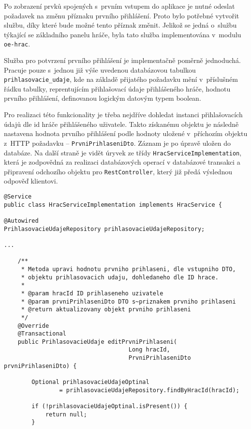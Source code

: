 \documentclass[12pt]{article}
\begin{document}
{Po zobrazení prvků spojených s~prvním vstupem do aplikace je nutné odeslat požadavek na změnu příznaku prvního přihlášení.
Proto bylo potřebné vytvořit službu, díky které bude možné tento příznak změnit.
Jelikož se jedná o~službu týkající se základního panelu hráče, byla tato služba implementována v~modulu \texttt{oe-hrac}.

Služba pro potvrzení prvního přihlášení je implementačně poměrně jednoduchá.
Pracuje pouze s~jednou již výše uvedenou databázovou tabulkou \texttt{prihlasovacie\_udaje},
kde na základě přijatého požadavku mění v~příslušném řádku tabulky,
reprentujícím přihlašovací údaje přihlášeného hráče, hodnotu prvního přihlášení,
definovanou logickým datovým typem boolean.

Pro realizaci této funkcionality je třeba nejdříve dohledat instanci přihlašovacích údajů dle id hráče přihlášeného uživatele.
Takto získanému objektu je následně nastavena hodnota prvního přihlášení
podle hodnoty uložené v~příchozím objektu z~HTTP požadavku -- \texttt{PrvniPrihlaseniDto}.
Záznam je po úpravě uložen do databáze.
Na další straně je vidět úryvek ze třídy \texttt{HracServiceImplementation},
která je zodpovědná za realizaci databázových operací v databázové transakci
a připravení odchozího objektu pro \texttt{RestController},
který již předá výslednou odpověď klientovi.

\clearpage

\begin{lstlisting}
@Service
public class HracServiceImplementation implements HracService {

@Autowired
PrihlasovacieUdajeRepository prihlasovacieUdajeRepository;

...

    /**
     * Metoda upravi hodnotu prvniho prihlaseni, dle vstupniho DTO,
     * objektu prihlasovacich udaju, dohledaneho dle ID hrace.
     * 
     * @param hracId ID prihlaseneho uzivatele
     * @param prvniPrihlaseniDto DTO s~priznakem prvniho prihlaseni
     * @return aktualizovany objekt prvniho prihlaseni
     */
    @Override
    @Transactional
    public PrihlasovacieUdaje editPrvniPrihlaseni(
                                    Long hracId,
                                    PrvniPrihlaseniDto prvniPrihlaseniDto) {

        Optional prihlasovacieUdajeOptinal
                = prihlasovacieUdajeRepository.findByHracId(hracId);

        if (!prihlasovacieUdajeOptinal.isPresent()) {
            return null;
        }


\end{lstlisting}}
\end{document}
